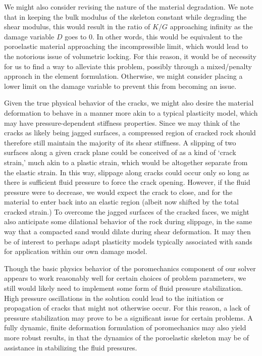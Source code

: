\documentclass[11pt]{article} %
\begin{document}
We might also consider revising the nature of the material degradation. We note that in keeping the bulk modulus of the skeleton constant while degrading the shear modulus, this would result in the ratio of $K/G$ approaching infinity as the damage variable $D$ goes to $0$. In other words, this would be equivalent to the poroelastic material approaching the incompressible limit, which would lead to the notorious issue of volumetric locking. For this reason, it would be of necessity for us to find a way to alleviate this problem, possibly through a mixed/penalty approach in the element formulation. Otherwise, we might consider placing a lower limit on the damage variable to prevent this from becoming an issue.

Given the true physical behavior of the cracks, we might also desire the material deformation to behave in a manner more akin to a typical plasticity model, which may have pressure-dependent stiffness properties. Since we may think of the cracks as likely being jagged surfaces, a compressed region of cracked rock should therefore still maintain the majority of its shear stiffness. A slipping of two surfaces along a given crack plane could be conceived of as a kind of `crack strain,' much akin to a plastic strain, which would be altogether separate from the elastic strain. In this way, slippage along cracks could occur only so long as there is sufficient fluid pressure to force the crack opening. However, if the fluid pressure were to decrease, we would expect the crack to close, and for the material to enter back into an elastic region (albeit now shifted by the total cracked strain.) To overcome the jagged surfaces of the cracked faces, we might also anticipate some dilational behavior of the rock during slippage, in the same way that a compacted sand would dilate during shear deformation. It may then be of interest to perhaps adapt plasticity models typically associated with sands for application within our own damage model.

Though the basic physics behavior of the poromechanics component of our solver appears to work reasonably well for certain choices of problem parameters, we still would likely need to implement some form of fluid pressure stabilization. High pressure oscillations in the solution could lead to the initiation or propagation of cracks that might not otherwise occur. For this reason, a lack of pressure stabilization may prove to be a significant issue for certain problems. A fully dynamic, finite deformation formulation of poromechanics may also yield more robust results, in that the dynamics of the poroelastic skeleton may be of assistance in stabilizing the fluid pressures.
\end{document}
